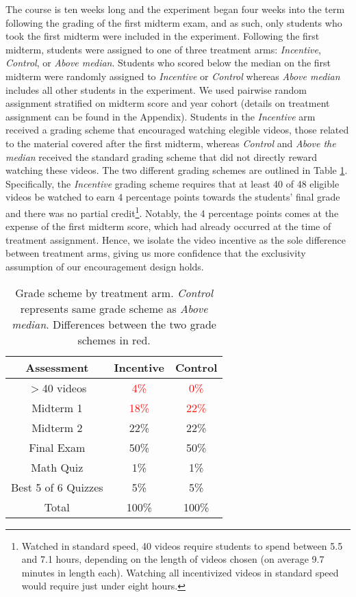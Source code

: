 \documentclass[12pt]{article}
\newcommand{\red}[1]{\textcolor{red}{#1}}
\begin{document}
The course is ten weeks long and the experiment began four weeks into the term following the grading of the first midterm exam, and as such, only students who took the first midterm were included in the experiment. Following the first midterm, students were assigned to one of three treatment arms: \textit{Incentive}, \textit{Control}, or \textit{Above median}. Students who scored below the median on the first midterm were randomly assigned to \textit{Incentive} or \textit{Control} whereas \textit{Above median} includes all other students in the experiment. We used pairwise random assignment stratified on midterm score and year cohort (details on treatment assignment can be found in the Appendix). Students in the \textit{Incentive} arm received a grading scheme that encouraged watching elegible videos, those related to the material covered after the first midterm, whereas \textit{Control} and \textit{Above the median} received the standard grading scheme that did not directly reward watching these videos. The two different grading schemes are outlined in Table \ref{gradescheme}. Specifically, the \textit{Incentive} grading scheme requires that at least 40 of 48 eligible videos be watched to earn 4 percentage points towards the students' final grade and there was no partial credit\footnote{Watched in standard speed, 40 videos require students to spend between 5.5 and 7.1 hours, depending on the length of videos chosen (on average 9.7 minutes in length each). Watching all incentivized videos in standard speed would require just under eight hours.}. Notably, the 4 percentage points comes at the expense of the first midterm score, which had already occurred at the time of treatment assignment. Hence, we isolate the video incentive as the sole difference between treatment arms, giving us more confidence that the exclusivity assumption of our encouragement design holds. %

\begin{table}
	\caption{Grade scheme by treatment arm. \textit{Control} represents same grade scheme as \textit{Above median}. Differences between the two grade schemes in red.}
	\centering
	\begin{tabular}{ c|c|c }
		Assessment & Incentive & Control \\
		\hline
		$>$40 videos & \red{4\%} & \red{0\%} \\
		Midterm 1 & \red{18\%} & \red{22\%} \\
		Midterm 2 & 22\% & 22\% \\
		Final Exam & 50\% & 50\% \\
		Math Quiz & 1\% & 1\% \\
		Best 5 of 6 Quizzes & 5\% & 5\% \\
		\hline
		Total & 100\% & 100\% \\
	\end{tabular}
	\label{gradescheme}
\end{table}
\end{document}
